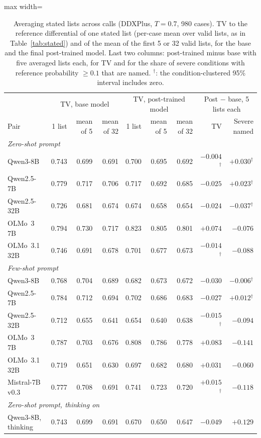 \documentclass[wcp]{jmlr}
\begin{document}
\begin{table}[t]
\centering
\begin{adjustbox}{max width=\textwidth}
\begin{tabular}{lrrrrrrrr}
\toprule
 & \multicolumn{3}{c}{TV, base model} & \multicolumn{3}{c}{TV, post-trained model} & \multicolumn{2}{c}{Post $-$ base, 5 lists each} \\
Pair & 1 list & mean of 5 & mean of 32 & 1 list & mean of 5 & mean of 32 & TV & Severe named \\
\midrule
\multicolumn{9}{l}{\emph{Zero-shot prompt}} \\
Qwen3-8B & 0.743 & 0.699 & 0.691 & 0.700 & 0.695 & 0.692 & $-0.004$$^{\dagger}$ & $+0.030$$^{\dagger}$ \\
Qwen2.5-7B & 0.779 & 0.717 & 0.706 & 0.717 & 0.692 & 0.685 & $-0.025$ & $+0.023$$^{\dagger}$ \\
Qwen2.5-32B & 0.726 & 0.681 & 0.674 & 0.674 & 0.658 & 0.654 & $-0.024$ & $-0.037$$^{\dagger}$ \\
OLMo~3 7B & 0.794 & 0.730 & 0.717 & 0.823 & 0.805 & 0.801 & $+0.074$ & $-0.076$ \\
OLMo~3.1 32B & 0.746 & 0.691 & 0.678 & 0.701 & 0.677 & 0.673 & $-0.014$$^{\dagger}$ & $-0.088$ \\
\midrule
\multicolumn{9}{l}{\emph{Few-shot prompt}} \\
Qwen3-8B & 0.768 & 0.704 & 0.689 & 0.682 & 0.673 & 0.672 & $-0.030$ & $-0.006$$^{\dagger}$ \\
Qwen2.5-7B & 0.784 & 0.712 & 0.694 & 0.702 & 0.686 & 0.683 & $-0.027$ & $+0.012$$^{\dagger}$ \\
Qwen2.5-32B & 0.712 & 0.655 & 0.641 & 0.654 & 0.640 & 0.638 & $-0.015$$^{\dagger}$ & $-0.094$ \\
OLMo~3 7B & 0.787 & 0.703 & 0.676 & 0.808 & 0.786 & 0.778 & $+0.083$ & $-0.141$ \\
OLMo~3.1 32B & 0.719 & 0.651 & 0.630 & 0.697 & 0.682 & 0.680 & $+0.031$ & $-0.060$ \\
Mistral-7B v0.3 & 0.777 & 0.708 & 0.691 & 0.741 & 0.723 & 0.720 & $+0.015$$^{\dagger}$ & $-0.118$ \\
\midrule
\multicolumn{9}{l}{\emph{Zero-shot prompt, thinking on}} \\
Qwen3-8B, thinking & 0.743 & 0.699 & 0.691 & 0.670 & 0.650 & 0.647 & $-0.049$ & $+0.129$ \\
\bottomrule
\end{tabular}
\end{adjustbox}
\caption{Averaging stated lists across calls (DDXPlus, $T{=}0.7$, 980 cases). TV to the reference differential of one stated list (per-case mean over valid lists, as in Table~\ref{tab:stated}) and of the mean of the first 5 or 32 valid lists, for the base and the final post-trained model. Last two columns: post-trained minus base with five averaged lists each, for TV and for the share of severe conditions with reference probability $\geq 0.1$ that are named. $^{\dagger}$: the condition-clustered 95\% interval includes zero.}
\label{tab:aggregate}
\end{table}
\end{document}
